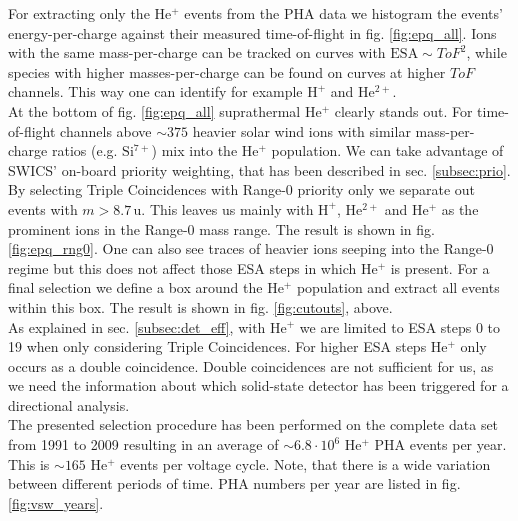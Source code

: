 For extracting only the $\mathrm{He^{+}}$ events from the PHA data we histogram the events' energy-per-charge against their measured time-of-flight in fig. \ref{fig:epq_all}. 
Ions with the same mass-per-charge can be tracked on curves with $\mathrm{ESA} \sim ToF^2$, while species with higher masses-per-charge can be found on curves at higher $ToF$ channels. This way one can identify for example $\mathrm{H^{+}}$ and $\mathrm{He^{2+}}$. \\
At the bottom of fig. \ref{fig:epq_all} suprathermal $\mathrm{He^{+}}$ clearly stands out. For time-of-flight channels above $\sim 375$ heavier solar wind ions with similar mass-per-charge ratios (e.g. $\mathrm{Si^{7+}}$) mix into the $\mathrm{He^{+}}$ population.
We can take advantage of SWICS' on-board priority weighting, that has been described in sec. \ref{subsec:prio}. By selecting Triple Coincidences with Range-0 priority only we separate out events with $m>8.7\,\mathrm{u}$. This leaves us mainly with $\mathrm{H^+}$, $\mathrm{He^{2+}}$ and $\mathrm{He^{+}}$ as the prominent ions in the Range-0 mass range. The result is shown in fig. \ref{fig:epq_rng0}. One can also see traces of heavier ions seeping into the Range-0 regime but this does not affect those ESA steps in which $\mathrm{He^{+}}$ is present.
For a final selection we define a box around the $\mathrm{He^{+}}$ population and extract all events within this box. The result is shown in fig. \ref{fig:cutouts}, above.
\\
As explained in sec. \ref{subsec:det_eff}, with $\mathrm{He^{+}}$ we are limited to ESA steps 0 to 19 when only considering Triple Coincidences. For higher ESA steps $\mathrm{He^{+}}$ only occurs as a double coincidence. Double coincidences are not sufficient for us, as we need the information about which solid-state detector has been triggered for a directional analysis.
\\
The presented selection procedure has been performed on the complete data set from 1991 to 2009 resulting in an average of $\sim 6.8\cdot10^{6}$ $\mathrm{He^{+}}$ PHA events per year. This is $\sim 165$ $\mathrm{He^{+}}$ events per voltage cycle. Note, that there is a wide variation between different periods of time. PHA numbers per year are listed in fig. \ref{fig:vsw_years}.
%
%
%
